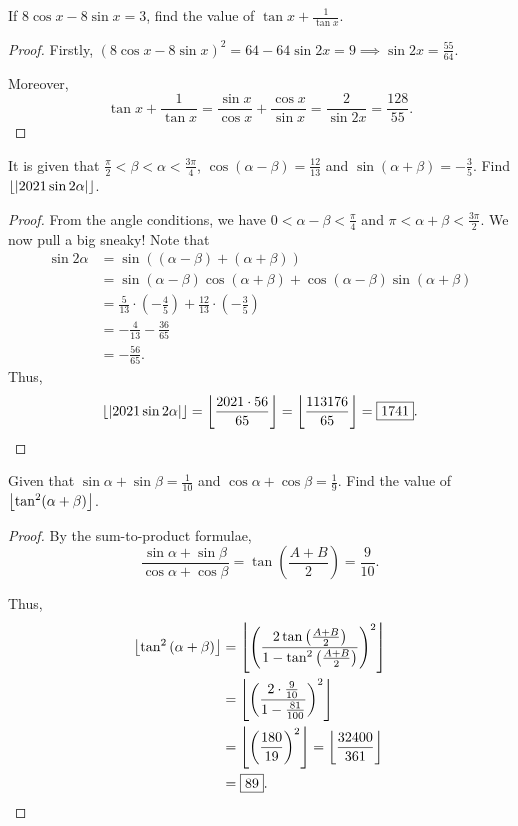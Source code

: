 \documentclass[../jarvis.tex]{subfiles}
\begin{document}
\begin{example}[2020 SMO(S) P9]
If $8\cos{x}-8\sin{x}=3$, find the value of $\tan{x}+\frac{1}{\tan{x}}$.
\end{example}
\begin{proof}
    Firstly, $(8\cos{x}-8\sin{x})^2=64-64\sin{2x}=9 \implies \sin{2x}=\frac{55}{64}$.
    
    Moreover, $$\tan{x}+\frac{1}{\tan{x}}=\frac{\sin{x}}{\cos{x}}+\frac{\cos{x}}{\sin{x}}=\frac{2}{\sin{2x}}=\boxed{\frac{128}{55}}.$$
\end{proof}

\begin{example}[2021 SMO(O) P1]
    It is given that $\frac{\pi}{2}<\beta<\alpha<\frac{3\pi}{4}$, $\cos{(\alpha-\beta)}=\frac{12}{13}$ and $\sin{(\alpha+\beta)}=-\frac{3}{5}$. Find $\left\lfloor |2021\sin{2\alpha}| \right\rfloor$.
\end{example}
\begin{proof}
    From the angle conditions, we have $0<\alpha-\beta<\frac{\pi}{4}$ and $\pi<\alpha+\beta<\frac{3\pi}{2}$. We now pull a big sneaky! Note that 
    \begin{align*}
        \sin{2\alpha}&=\sin{((\alpha-\beta)+(\alpha+\beta))} \\
        &=\sin{(\alpha-\beta)}\cos{(\alpha+\beta)}+\cos{(\alpha-\beta)}\sin{(\alpha+\beta)} \\
        &=\frac{5}{13}\cdot\left(-\frac{4}{5}\right)+\frac{12}{13}\cdot\left(-\frac{3}{5}\right) \\
        &=-\frac{4}{13}-\frac{36}{65} \\
        &=-\frac{56}{65}.
    \end{align*}
    Thus, $$\left\lfloor |2021\sin{2\alpha}| \right\rfloor=\left\lfloor \frac{2021\cdot56}{65} \right\rfloor=\left\lfloor \frac{113176}{65} \right\rfloor=\boxed{1741}.$$
\end{proof}


\begin{example}[2021 SMO(O) P12]
    Given that $\sin{\alpha}+\sin{\beta}=\frac{1}{10}$ and $\cos{\alpha}+\cos{\beta}=\frac{1}{9}$. Find the value of $\left\lfloor \tan^2(\alpha+\beta) \right\rfloor$.
\end{example}
\begin{proof}
    By the sum-to-product formulae,
    $$\frac{\sin{\alpha}+\sin{\beta}}{\cos{\alpha}+\cos{\beta}}=\tan{\left(\frac{A+B}{2}\right)}=\frac{9}{10}.$$

    Thus,
    \begin{align*}
        \left\lfloor \tan^2{(\alpha+\beta)} \right\rfloor&=\left\lfloor \left(\frac{2\tan{\left(\frac{A+B}{2}\right)}}{1-\tan^2{\left(\frac{A+B}{2}\right)}}\right)^2 \right\rfloor\\
        &=\left\lfloor \left(\frac{2\cdot\frac{9}{10}}{1-\frac{81}{100}}\right)^2 \right\rfloor\\
        &=\left\lfloor \left(\frac{180}{19}\right)^2 \right\rfloor=\left\lfloor \frac{32400}{361} \right\rfloor \\
        &=\boxed{89}.
    \end{align*}
\end{proof}
\end{document}
